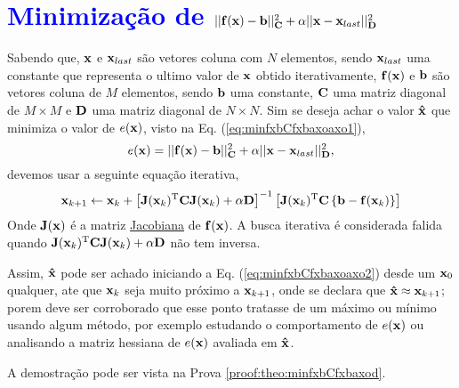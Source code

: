 
\section{\textcolor{blue}{Minimização de $||\VECTOR{f}(\VECTOR{x})-\VECTOR{b}||_{\MATRIX{C}}^2+\alpha||\VECTOR{x}-\VECTOR{x}_{last}||_{\MATRIX{D}}^2$}
}

\begin{theorem}\label{theo:minfxbCfxbaxoaxo}
Sabendo que, $\VECTOR{x}$ e $\VECTOR{x}_{last}$ são vetores coluna com $N$ elementos, 
sendo $\VECTOR{x}_{last}$ uma constante que representa o ultimo valor de $\VECTOR{x}$ obtido iterativamente, $\VECTOR{f}(\VECTOR{x})$ e 
$\VECTOR{b}$ são vetores coluna de $M$ elementos, sendo $\VECTOR{b}$ uma constante,
$\MATRIX{C}$ uma matriz diagonal de $M \times M$ e 
$\MATRIX{D}$ uma matriz diagonal de $N \times N$.
Sim se deseja achar o valor $\VECTOR{\hat{x}}$ que minimiza o valor de $e(\VECTOR{x})$, visto na Eq. (\ref{eq:minfxbCfxbaxoaxo1}),
\begin{equation}\label{eq:minfxbCfxbaxoaxo1}
e(\VECTOR{x})=||\VECTOR{f}(\VECTOR{x})-\VECTOR{b}||_{\MATRIX{C}}^2+\alpha||\VECTOR{x}-\VECTOR{x}_{last}||_{\MATRIX{D}}^2,
\end{equation}
devemos usar a seguinte equação iterativa,
\begin{equation}\label{eq:minfxbCfxbaxoaxo2}
\VECTOR{x}_{k+1}\leftarrow \VECTOR{x}_k+
\left[ \MATRIX{J}(\VECTOR{x}_k)^{\transpose}\MATRIX{C} \MATRIX{J}(\VECTOR{x}_k) +\alpha\MATRIX{D} \right]^{-1}
 \left[\MATRIX{J}(\VECTOR{x}_k)^{\transpose}\MATRIX{C}\left\{\VECTOR{b}-\VECTOR{f}(\VECTOR{x}_k)\right\}\right] 
\end{equation}
Onde  $\MATRIX{J}(\VECTOR{x})$ é a matriz \hyperref[def:jacobian]{Jacobiana} \cite{Jacobian} de $\VECTOR{f}(\VECTOR{x})$.
A busca iterativa é considerada falida quando 
$\MATRIX{J}(\VECTOR{x}_k)^{\transpose}\MATRIX{C} \MATRIX{J}(\VECTOR{x}_k) +\alpha\MATRIX{D}$
não tem inversa.

Assim, $\VECTOR{\hat{x}}$ pode ser achado iniciando a Eq. (\ref{eq:minfxbCfxbaxoaxo2}) desde um $\VECTOR{x}_{0}$ qualquer, ate que $\VECTOR{x}_{k}$ seja muito próximo a $\VECTOR{x}_{k+1}$,
onde se declara que $\VECTOR{\hat{x}} \approx \VECTOR{x}_{k+1}$; porem deve ser corroborado
que esse ponto tratasse de um máximo ou mínimo usando algum método, por exemplo estudando o comportamento 
de $e(\VECTOR{x})$ ou analisando a matriz hessiana de $e(\VECTOR{x})$ avaliada em $\VECTOR{\hat{x}}$.

A demostração pode ser vista na Prova \ref{proof:theo:minfxbCfxbaxod}.
\end{theorem} 

